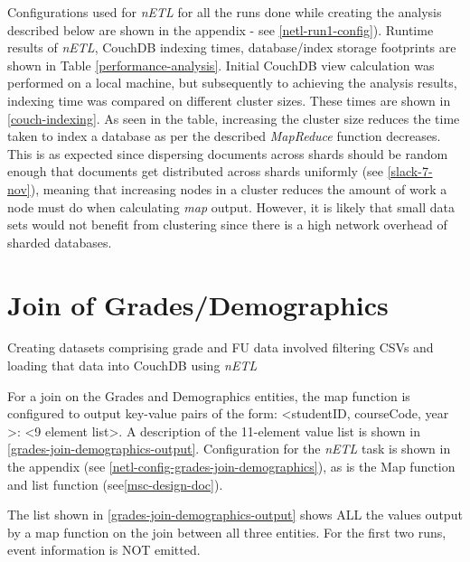 Configurations used for \textit{nETL} for all the runs done while creating the analysis described below are shown in the appendix - see \ref{netl-run1-config}). Runtime results of \textit{nETL}, CouchDB indexing times, database/index storage footprints are shown in Table \ref{performance-analysis}. Initial CouchDB view calculation was performed on a local machine, but subsequently to achieving the analysis results, indexing time was compared on different cluster sizes. These times are shown in \ref{couch-indexing}. As seen in the table, increasing the cluster size reduces the time taken to index a database as per the described \textit{MapReduce} function decreases. This is as expected since dispersing documents across shards should be random enough that documents get distributed across shards uniformly (see \ref{slack-7-nov}), meaning that increasing nodes in a cluster reduces the amount of work a node must do when calculating \textit{map} output. However, it is likely that small data sets would not benefit from clustering since there is a high network overhead of sharded databases.

\section{Join of Grades/Demographics}
Creating datasets comprising grade and FU data involved filtering CSVs and loading that data into CouchDB using \textit{nETL}

For a join on the Grades and Demographics entities, the map function is configured to output key-value pairs of the form: \textless studentID, courseCode, year \textgreater : <9 element list>. A description of the 11-element value list is shown in \ref{grades-join-demographics-output}. Configuration for the \textit{nETL} task is shown in the appendix (see \ref{netl-config-grades-join-demographics}), as is the Map function and list function (see\ref{msc-design-doc}).

The list shown in \ref{grades-join-demographics-output} shows ALL the values output by a map function on the join between all three entities. For the first two runs, event information is NOT emitted.

